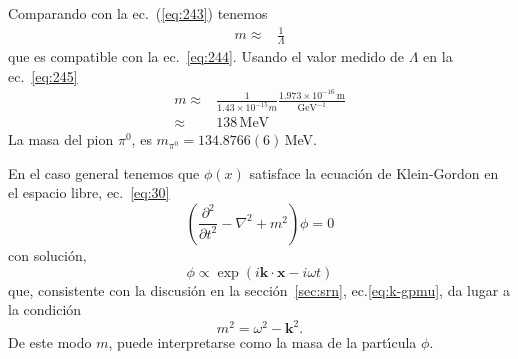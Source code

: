 \begin{frame}
Comparando con la ec.~(\ref{eq:243}) tenemos
\begin{align}
  m\approx&\frac{1}{\Lambda}
\end{align}
que es compatible con la ec.~\eqref{eq:244}. Usando el valor medido de $\Lambda$ en la ec.~\eqref{eq:245}
\begin{align}
  m\approx&\frac{1}{1.43\times10^{-15}m}\frac{1.973\times10^{-16}\,\text{m}}{\text{GeV}^{-1}}\nonumber\\
  \approx&138\,\text{MeV}
\end{align}
La masa del pion $\pi^0$, es $m_{\pi^0}=134.8766(6)\,$MeV.
\end{frame}


En el caso general tenemos que $\phi(x)$ satisface la ecuaci\'on de Klein-Gordon en el espacio libre, ec.~\eqref{eq:30}
\begin{equation}
    (\frac{\partial^2}{\partial t^2}-\nabla^2+m^2)\phi=0
\end{equation}
con soluci\'on, 
\begin{equation}
  \phi\propto\exp(i\mathbf{k}\cdot\mathbf{x}-i\omega t)
\end{equation}
que, consistente con la discusi\'on en la secci\'on~\ref{sec:srn}, ec.\eqref{eq:k-gpmu}, da lugar a la condici\'on 
\begin{equation}
  m^2=\omega^2-\mathbf{k}^2.
\end{equation}
De este modo $m$, puede interpretarse como la masa de la part\'\i cula $\phi$.

